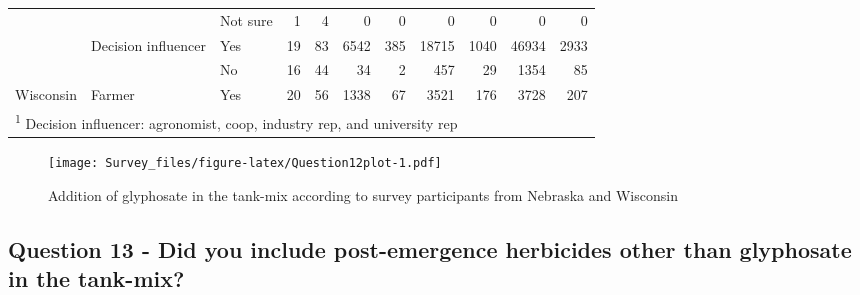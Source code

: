 \documentclass[]{article}
\begin{document}
\begin{landscape}
\begin{table}[!h]
\begin{tabular}[t]{lllrrrrrrrr}
 &  & Not sure & 1 & 4 & 0 & 0 & 0 & 0 & 0 & 0\\

 & \multirow{-3}{*}{\raggedright\arraybackslash Decision influencer} & Yes & 19 & 83 & 6542 & 385 & 18715 & 1040 & 46934 & 2933\\

 &  & No & 16 & 44 & 34 & 2 & 457 & 29 & 1354 & 85\\

\multirow{-5}{*}{\raggedright\arraybackslash Wisconsin} & \multirow{-2}{*}{\raggedright\arraybackslash Farmer} & Yes & 20 & 56 & 1338 & 67 & 3521 & 176 & 3728 & 207\\
\bottomrule
\multicolumn{11}{l}{\textsuperscript{1} Decision influencer: agronomist, coop, industry rep, and university rep}\\
\end{tabular}
\end{table}
\end{landscape}

\begin{figure}
\centering
\texttt{[image: Survey\_files/figure-latex/Question12plot-1.pdf]}
\caption{Addition of glyphosate in the tank-mix according to survey
participants from Nebraska and Wisconsin}
\end{figure}

\newpage

\subsection{Question 13 - Did you include post-emergence herbicides
other than glyphosate in the
tank-mix?}\label{question-13---did-you-include-post-emergence-herbicides-other-than-glyphosate-in-the-tank-mix}
\end{document}
